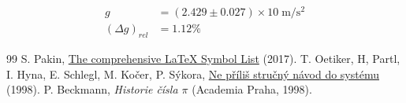 \documentclass{article}
\begin{document}
\begin{equation}\begin{aligned}
g &= (2.429 \pm 0.027) \times 10\;\mathrm{m/s^2}\\
\left(\Delta g\right)_{rel} &= 1.12\%
\end{aligned}\end{equation}

	\begin{thebibliography}{99}
		 S. Pakin, \href{http://tug.ctan.org/info/symbols/comprehensive/symbols-a4.pdf}{The comprehensive \LaTeX{} Symbol List} (2017).
		 T. Oetiker, H, Partl, I. Hyna, E. Schlegl, M. Kočer, P. Sýkora,
			\href{http://www.penguin.cz/~kocer/texty/lshort2e/lshort2e-cz.pdf}{Ne příliš stručný návod do systému \LaTeXe} (1998).
		 P. Beckmann, \textit{Historie čísla $\pi$} (Academia Praha, 1998).
	\end{thebibliography}

	\tableofcontents

	\listoffigures

	\listoftables
\end{document}
